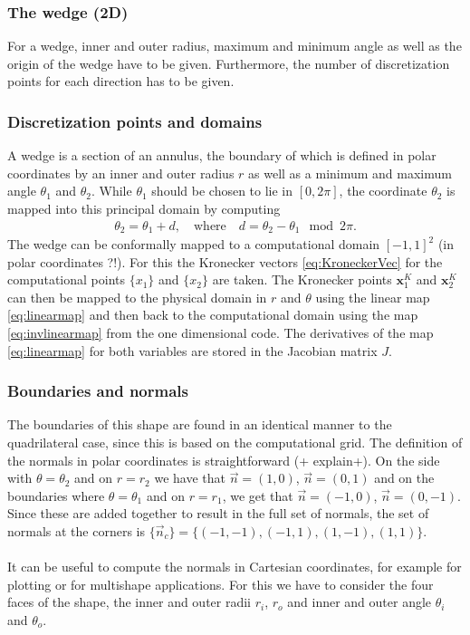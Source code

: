 \subsubsection{The wedge (2D)}
For a wedge, inner and outer radius, maximum and minimum angle as well as the origin of the wedge have to be given. Furthermore, the number of discretization points for each direction has to be given.
\subsubsection*{Discretization points and domains}\label{sec:2DWedgePts}
A wedge is a section of an annulus, the boundary of which is defined in polar coordinates by an inner and outer radius $r$ as well as a minimum and maximum angle $\theta_1$ and $\theta_2$. While $\theta_1$ should be chosen to lie in $[0, 2 \pi]$, the coordinate $\theta_2$ is mapped into this principal domain by computing 
\begin{align*}
	\theta_2 = \theta_1 +  d, \quad \text{where} \quad d = \theta_2 - \theta_1\mod 2 \pi.
\end{align*}
The wedge can be conformally mapped to a computational domain $[-1,1]^2$ (in polar coordinates ?!). For this the Kronecker vectors \eqref{eq:KroneckerVec} for the computational points $\{x_1\}$ and $\{x_2\}$ are taken. 
The Kronecker points $\mathbf{x}_1^{K}$ and $\mathbf{x}_2^{K}$ can then be mapped to the physical domain in $r$ and $\theta$ using the linear map \eqref{eq:linearmap} and then back to the computational domain using the map \eqref{eq:invlinearmap} from the one dimensional code. The derivatives of the map \eqref{eq:linearmap} for both variables are stored in the Jacobian matrix $J$.


\subsubsection*{Boundaries and normals}
The boundaries of this shape are found in an identical manner to the quadrilateral case, since this is based on the computational grid. The definition of the normals in polar coordinates is straightforward (+ explain+). On the side with $\theta = \theta_2$ and on $r = r_2$ we have that $\vec n = (1,0)$, $\vec n = (0,1)$ and on the boundaries where $\theta = \theta_1$ and on $r = r_1$, we get that $\vec n = (-1,0)$, $\vec n = (0,-1)$. Since these are added together to result in the full set of normals, the set of normals at the corners is $\{\vec n_c\} = \{(-1,-1), (-1,1), (1,-1), (1,1)\}$. 
\\
\\
It can be useful to compute the normals in Cartesian coordinates, for example for plotting or for multishape applications. For this we have to consider the four faces of the shape, the inner and outer radii $r_i$, $r_o$ and inner and outer angle $\theta_i$ and $\theta_o$.

